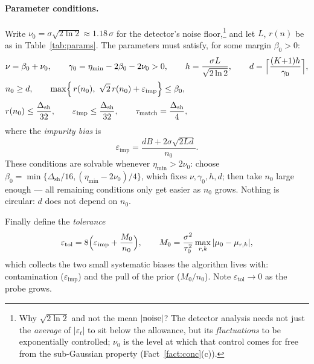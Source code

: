 \documentclass[11pt]{article}
\newcommand{\eimp}{\varepsilon_{\mathrm{imp}}}
\newcommand{\etol}{\varepsilon_{\mathrm{tol}}}
\newcommand{\dsh}{\Delta_{\mathrm{sh}}}
\newcommand{\taum}{\tau_{\mathrm{match}}}
\newcommand{\nun}{\nu_0}
\begin{document}
\paragraph{Parameter conditions.}
Write $\nun=\sigma\sqrt{2\ln2}\approx1.18\,\sigma$ for the detector's noise floor,\footnote{Why $\sqrt{2\ln2}$ and not the mean $|{\rm noise}|$? The detector analysis needs not just the \emph{average} of $|\varepsilon_t|$ to sit below the allowance, but its \emph{fluctuations} to be exponentially controlled; $\nun$ is the level at which that control comes for free from the sub-Gaussian property (Fact~\ref{fact:conc}(c)).} and let $L$, $r(n)$ be as in Table~\ref{tab:params}. The parameters must satisfy, for some margin $\beta_0>0$:
\begin{equation}
\begin{aligned}
&\nu=\beta_0+\nun,
\qquad
\gamma_0=\eta_{\min}-2\beta_0-2\nun>0,
\qquad
h=\frac{\sigma L}{\sqrt{2\ln2}},
\qquad
d=\Bigl\lceil\frac{(K{+}1)h}{\gamma_0}\Bigr\rceil,\\[2pt]
&n_0\ge d,
\qquad
\max\Bigl\{\,r(n_0),\ \sqrt2\,r(n_0)+\eimp\Bigr\}\le\beta_0,\\[2pt]
&r(n_0)\le\frac{\dsh}{32},
\qquad
\eimp\le\frac{\dsh}{32},
\qquad
\taum=\frac{\dsh}{4},
\end{aligned}
\label{eq:conditions}
\end{equation}
where the \emph{impurity bias} is
\begin{equation}
    \eimp=\frac{dB+2\sigma\sqrt{2Ld}}{n_0} .
    \label{eq:eimp}
\end{equation}
These conditions are solvable whenever $\eta_{\min}>2\nun$: choose $\beta_0=\min\{\dsh/16,(\eta_{\min}-2\nun)/4\}$, which fixes $\nu,\gamma_0,h,d$; then take $n_0$ large enough --- all remaining conditions only get easier as $n_0$ grows. Nothing is circular: $d$ does not depend on $n_0$.

Finally define the \emph{tolerance}
\begin{equation}
    \etol=8\Bigl(\eimp+\frac{M_0}{n_0}\Bigr),
    \qquad
    M_0=\frac{\sigma^2}{\tau_0^2}\max_{r,k}|\mu_0-\mu_{r,k}| ,
    \label{eq:etol}
\end{equation}
which collects the two small systematic biases the algorithm lives with: contamination ($\eimp$) and the pull of the prior ($M_0/n_0$). Note $\etol\to0$ as the probe grows.
\end{document}
